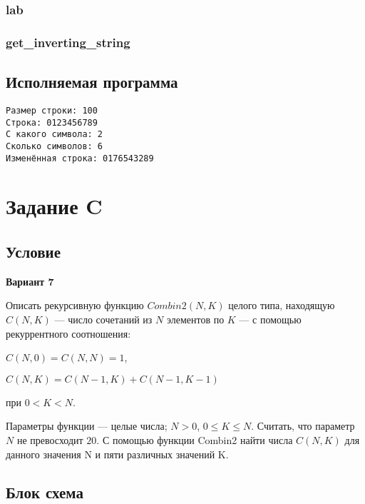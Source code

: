 \documentclass[12pt, a4paper]{article}
\begin{document}
\subsubsection{lab}



\subsubsection{get\_inverting\_string}



\subsection{Исполняемая программа}

\begin{verbatim}
Размер строки: 100
Строка: 0123456789
С какого символа: 2
Сколько символов: 6
Изменённая строка: 0176543289
\end{verbatim}

\newpage

\section{Задание C}

\subsection{Условие}

\begin{center}
    \textbf{Вариант 7}
\end{center}

Описать рекурсивную функцию $Combin2(N, K)$ целого типа, находящую $C(N, K)$ — число сочетаний из $N$ элементов по $K$ — с помощью рекуррентного соотношения:

$C(N, 0) = C(N, N) = 1$,

$C(N, K) = C(N - 1, K) + C(N - 1, K - 1)$

при $0 < K < N$.

Параметры функции — целые числа; $N > 0$, $0 \leq K \leq N$. Считать, что параметр $N$ не превосходит $20$. С помощью функции Combin2 найти числа $C(N, K)$ для данного значения N и пяти различных значений K.

\subsection{Блок схема}
\end{document}
